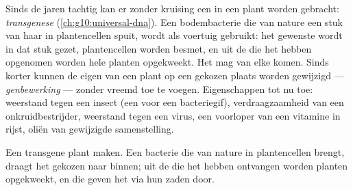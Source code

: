 \begin{proposition}\label{prop:g12:domesticated-plants:transgenic}
Sinds de jaren tachtig kan er zonder kruising een  in een plant worden
gebracht: \emph{transgenese} (\cref{ch:g10:universal-dna}).
Een bodembacterie die van nature een stuk van haar  in plantencellen
spuit, wordt als voertuig gebruikt: het gewenste  wordt in dat stuk
gezet, plantencellen worden besmet, en uit de  die het  hebben
opgenomen worden hele planten opgekweekt. Het  mag van elke 
komen. Sinds korter kunnen de eigen  van een plant op een gekozen
plaats worden gewijzigd --- \emph{genbewerking} --- zonder vreemd  toe
te voegen. Eigenschappen tot nu toe: weerstand tegen een insect (een 
voor een bacteriegif), verdraagzaamheid van een onkruidbestrijder,
weerstand tegen een virus, een voorloper van een vitamine in rijst, oliën
van gewijzigde samenstelling.
\end{proposition}
\admitted

\begin{omfigure}

{\small Een transgene plant maken. Een bacterie die van nature  in
plantencellen brengt, draagt het gekozen  naar binnen; uit de 
die het hebben ontvangen worden planten opgekweekt, en die geven het via
hun zaden door.}
\end{omfigure}

